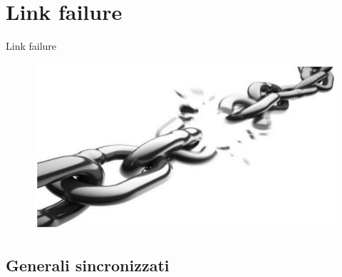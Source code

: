 \section{Link failure}

	\logo{}

	\begin{frame}
		\begin{center}
			\LARGE{Link failure}
		\end{center}
		\begin{center}
			\begin{figure}
				\includegraphics[width=.9\textwidth]{img/link2}
			\end{figure}
		\end{center}
	\end{frame}

	\subsection{Generali sincronizzati}
	
	
